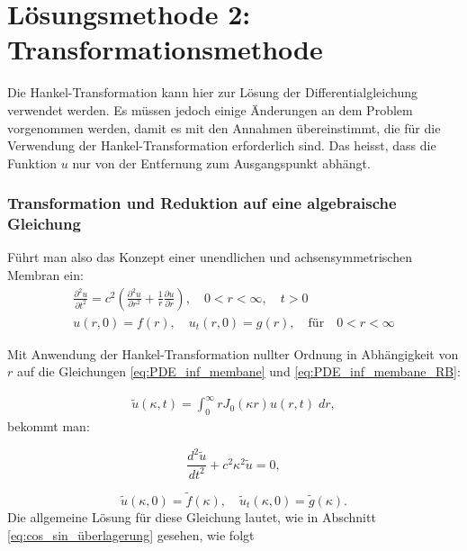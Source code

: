 %
%
%
\section{Lösungsmethode 2: Transformationsmethode
\label{kreismembran:section:teil3}}
Die Hankel-Transformation kann hier zur Lösung der Differentialgleichung verwendet werden. Es müssen jedoch einige Änderungen an dem Problem vorgenommen werden, damit es mit den Annahmen übereinstimmt, die für die Verwendung der Hankel-Transformation erforderlich sind. Das heisst, dass die Funktion $u$ nur von der Entfernung zum Ausgangspunkt abhängt. 

\subsubsection{Transformation und Reduktion auf eine algebraische Gleichung\label{subsub:transf_reduktion}}
Führt man also das Konzept einer unendlichen und achsensymmetrischen Membran ein:
\begin{align}
	\frac{\partial^2u}{\partial t^2}
	=
	c^2  \left(\frac{\partial^2 u}{\partial r^2}
	+
	\frac{1}{r}
	\frac{\partial u}{\partial r} \right), \quad 0<r<\infty, \quad t>0   \label{eq:PDE_inf_membane} \\
		u(r,0)=f(r), \quad u_t(r,0) = g(r), \quad \text{für} \quad 0<r<\infty
	\label{eq:PDE_inf_membane_RB}
\end{align}


Mit Anwendung der Hankel-Transformation nullter Ordnung in Abhängigkeit von $r$ auf die Gleichungen \eqref{eq:PDE_inf_membane} und \eqref{eq:PDE_inf_membane_RB}:

\begin{align}
	\tilde{u}(\kappa,t)=\int_{0}^{\infty}r J_0(\kappa r)u(r,t) \; dr,
\end{align}
bekommt man:

\begin{equation*}
	\frac{d^2 \tilde{u}}{dt^2} + c^2\kappa^2\tilde{u}=0,
\end{equation*}

\begin{equation*}
	\tilde{u}(\kappa,0)=\tilde{f}(\kappa), \quad 
	\tilde{u}_t(\kappa,0)=\tilde{g}(\kappa).
\end{equation*}
Die allgemeine Lösung für diese Gleichung lautet, wie in Abschnitt \eqref{eq:cos_sin_überlagerung} gesehen, wie folgt

